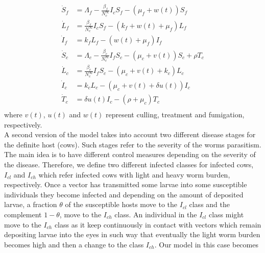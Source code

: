 \documentclass[preprint,12pt]{elsarticle}
\begin{document}
\begin{equation}\label{Eq:SIvectorhostmodelcontrol}
\begin{aligned}
    \dot{S}_f&=
        \Lambda_f-\frac{\beta_f}{N_c^{\infty}}I_c S_f-(\mu_f+w(t))S_f
    \\
    \dot{L}_f&=
        \frac{\beta_f}{N_c^{\infty}} I_c S_f-
        \left(
            k_f + w(t) + \mu_f
        \right) L_f
    \\
    \dot{I}_f&=
        k_f L_f-(w(t)+\mu_f)I_f
    \\
    \dot{S}_c&=
        \Lambda_c-\frac{\beta_c}{N_c^{\infty}}I_f S_c-
        \left(
            \mu_c + v(t)
        \right)
        S_c + \rho T_c
    \\
    \dot{L}_c&=
        \frac{\beta_c}{N_c^{\infty}} I_f S_c -
        \left(
            \mu_c + v(t) +
            k_c
        \right)L_c
    \\
    \dot{I}_c&=
        k_c L_c -
        (\mu_c + v(t) + \delta u(t))I_c
    \\
    \dot{T}_c&=
        \delta u(t) I_c -
        \left(
            \rho  + \mu_c
        \right) T_c
    \\
\end{aligned}
\end{equation}
where $v(t)$, $u(t)$ and $w(t)$ represent culling, treatment and fumigation, respectively.\\
\noindent A second version of the model takes into account two different disease stages for the definite host (cows). Such stages refer to the severity of the worms parasitism. The main idea is to have different control measures depending on the severity of the disease. Therefore, we define two
different infected classes for infected cows, $I_{cl}$ and $I_{ch}$ which refer infected cows with light and heavy worm burden, respectively. Once a vector has transmitted some larvae into some susceptible individuals they become infected and depending on the amount of deposited larvae, a fraction $\theta$ of the susceptible hosts move to the $I_{cl}$ class and the complement $1-\theta$, move to the $I_{ch}$ class. An individual in the $I_{cl}$ class might move to the $I_{ch}$ class as it keep continuously in contact with vectors which remain depositing larvae into the eyes in such way that eventually the light worm burden becomes high and then a change to the class $I_{ch}$. Our model in this case becomes
\end{document}
